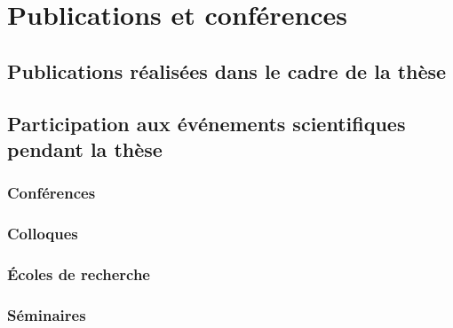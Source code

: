 \chapter*{Publications et conférences}

\section*{Publications réalisées dans le cadre de la thèse}



\section*{Participation aux événements scientifiques pendant la thèse}

\subsection*{Conférences}

\subsection*{Colloques}

\subsection*{Écoles de recherche}

\subsection*{Séminaires}
